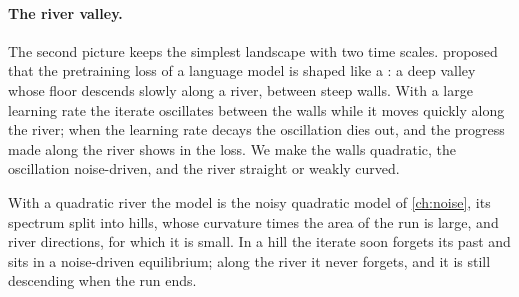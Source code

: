 \begin{refsection}
\paragraph{The river valley.} The second picture keeps the simplest landscape with two time scales. \Textcite{WenEtAl2025} proposed that the pretraining loss of a language model is shaped like a : a deep valley whose floor descends slowly along a river, between steep walls. With a large learning rate the iterate oscillates between the walls while it moves quickly along the river; when the learning rate decays the oscillation dies out, and the progress made along the river shows in the loss. We make the walls quadratic, the oscillation noise-driven, and the river straight or weakly curved.


With a quadratic river the model is the noisy quadratic model of \cref{ch:noise}, its spectrum split into hills, whose curvature times the area of the run is large, and river directions, for which it is small. In a hill the iterate soon forgets its past and sits in a noise-driven equilibrium; along the river it never forgets, and it is still descending when the run ends.


\end{refsection}
